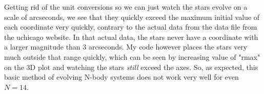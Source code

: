 \documentclass[11pt,letterpaper]{article}
\begin{document}
Getting rid of the unit conversions so we can just watch the stars evolve on a scale of 
arcseconds, we see that they quickly exceed the maximum initial value of each coordinate 
very quickly, contrary to the actual data from the data file from the uchicago website. 
In that actual data, the stars never have a coordinate with a larger magnitude than 3 
arcseconds. My code however places the stars very much outside that range quickly, which
can be seen by increasing value of "rmax" on the 3D plot and watching the stars 
\textit{still} exceed the axes. So, as expected, this basic method of evolving N-body
systems does not work very well for even $N=14$.
\end{document}

